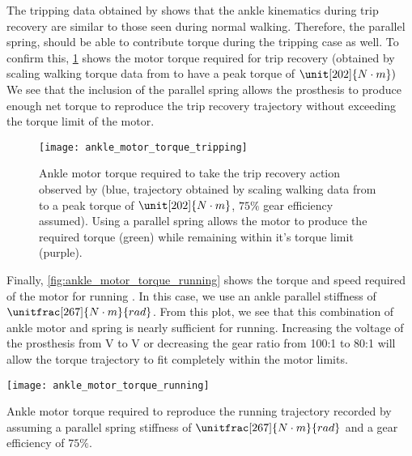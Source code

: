 The tripping data obtained by \citet{pijnappels2005early} shows that the ankle
kinematics during trip recovery are similar to those seen during normal walking.
Therefore, the parallel spring, should be able to contribute torque during the
tripping case as well. To confirm this, \cref{fig:ankle_motor_torque_tripping}
shows the motor torque required for trip recovery (obtained by scaling walking
torque data from \citet{winter2009biomechanics} to have a peak torque of
$\unit[202]{N \cdot m})$ We see that the inclusion of the parallel spring allows
the prosthesis to produce enough net torque to reproduce the trip recovery
trajectory without exceeding the torque limit of the motor. 
\begin{figure}[b]
    \centering 
    \texttt{[image: ankle\_motor\_torque\_tripping]}
    \caption{Ankle motor torque required to take the trip recovery action
    observed by \citet{pijnappels2005early} (blue, trajectory obtained by
    scaling walking data from \citet{winter2009biomechanics} to a peak torque of
    $\unit[202]{N \cdot m}$, $75\%$ gear efficiency assumed). Using a parallel
    spring allows the motor to produce the required torque (green) while
    remaining within it's torque limit (purple).
    }\label{fig:ankle_motor_torque_tripping}
\end{figure}

Finally, \cref{fig:ankle_motor_torque_running} shows the torque and speed
required of the motor for running \citep{novacheck1998biomechanics}. In this
case, we use an ankle parallel stiffness of $\unitfrac[267]{N \cdot m}{rad}$.
From this plot, we see that this combination of ankle motor and spring is nearly
sufficient for running. Increasing the voltage of the prosthesis from
\unit[48]{V} to \unit[60]{V} or decreasing the gear ratio from 100:1 to 80:1
will allow the torque trajectory to fit completely within the motor limits. 
\begin{marginfigure}[-0in]
    \centering 
    \texttt{[image: ankle\_motor\_torque\_running]}
    \caption{Ankle motor torque required to reproduce the running trajectory
    recorded by \citet{novacheck1998biomechanics} assuming a parallel spring
    stiffness of $\unitfrac[267]{N \cdot m}{rad}$ and a gear efficiency of
    $75\%$.
    }\label{fig:ankle_motor_torque_running}
\end{marginfigure}

